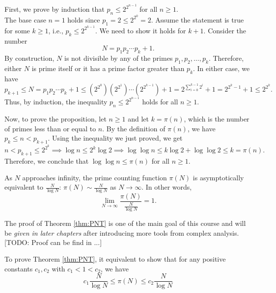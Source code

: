 \documentclass{elegantbook}
\begin{document}
\begin{solution}
  First, we prove by induction that $p_n \leq 2^{2^{n-1}}$ for all $n \geq 1$. \\
  The base case $n=1$ holds since $p_1 = 2 \leq 2^{2^0} = 2$. Assume the statement is true for some $k \geq 1$, i.e., $p_k \leq 2^{2^{k-1}}$. We need to show it holds for $k+1$. Consider the number
  \[
    N = p_1 p_2 \cdots p_k + 1.
  \]
  By construction, $N$ is not divisible by any of the primes $p_1, p_2, \ldots, p_k$. Therefore, either $N$ is prime itself or it has a prime factor greater than $p_k$. In either case, we have
  \[
    p_{k+1} \leq N = p_1 p_2 \cdots p_k + 1 \leq (2^{2^0})(2^{2^1}) \cdots (2^{2^{k-1}}) + 1 = 2^{\sum_{i=0}^{k-1} 2^i} + 1 = 2^{2^k - 1} + 1 \leq 2^{2^k}.
  \]
  Thus, by induction, the inequality $p_n \leq 2^{2^{n-1}}$ holds for all $n \geq 1$.

  Now, to prove the proposition, let $n \geq 1$ and let $k = \pi(n)$, which is the number of primes less than or equal to $n$. By the definition of $\pi(n)$, we have $p_k \leq n < p_{k+1}$. Using the inequality we just proved, we get
  \[
    n < p_{k+1} \leq 2^{2^k} \implies \log n \leq 2^k\log 2 \implies \log \log n \leq k \log 2 + \log \log 2\leq k=\pi(n).
  \]
  Therefore, we conclude that $\log \log n \leq \pi(n)$ for all $n \geq 1$.
\end{solution}

\begin{theorem} \label{thm:PNT}
  As $N$ approaches infinity, the prime counting function $\pi(N)$ is asymptotically equivalent to $\frac{N}{\log N}$: $\pi(N)\sim \frac{N}{\log N}$ as $N \to \infty$. In other words,
  \[
    \lim_{N \to \infty} \frac{\pi(N)}{\frac{N}{\log N}} = 1.
  \]
\end{theorem}

The proof of Theorem \ref{thm:PNT} is one of the main goal of this course and will be \textit{given in later chapters} after introducing more tools from complex analysis. [TODO: Proof can be find in ...]

\begin{lemma}
  To prove Theorem \ref{thm:PNT}, it equivalent to show that for any positive constants $c_1, c_2$ with $c_1 < 1 < c_2$, we have
  \[
    c_1 \frac{N}{\log N} \leq \pi(N) \leq c_2 \frac{N}{\log N}
  \]
\end{lemma}
\end{document}
